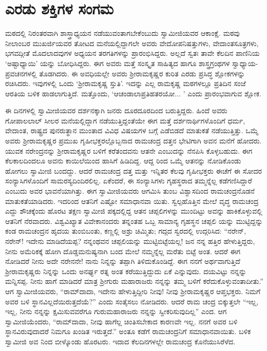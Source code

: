 
\chapter{ಎರಡು ಶಕ್ತಿಗಳ ಸಂಗಮ}

\noindent

ಮಠದಲ್ಲಿ ನಿರಂತರವಾಗಿ ಶಾಸ್ತ್ರಾಧ್ಯಯನ ನಡೆಯುವಂತಾಗಬೇಕೆಂಬುದು ಸ್ವಾಮೀಜಿಯವರ ಆಕಾಂಕ್ಷೆ. ಮಠವು ನೀಲಾಂಬರ ಮುಖರ್ಜಿಯವರ ತೋಟದ ಮನೆಯಲ್ಲಿದ್ದಾಗಲೇ ಅವರು ವೇದೋಪನಿಷತ್ತುಗಳು, ವೇದಾಂತಸೂತ್ರಗಳು, ಭಗವದ್ಗೀತೆ ಮೊದಲಾದವುಗಳ ಅಧ್ಯಯನ ತರಗತಿಗಳನ್ನು ಪ್ರಾರಂಭಿಸಿದ್ದರು. ಅಲ್ಲದೆ ಸ್ವತಃ ತಾವೇ ಕೆಲದಿನ ಪಾಣಿನಿಯ ‘ಅಷ್ಟಾಧ್ಯಾಯಿ’ ಯನ್ನು ಬೋಧಿಸಿದ್ದರು. ಈಗ ಅವರು ಮತ್ತೆ ಸಂಸ್ಕೃತ ಸಾಹಿತ್ಯದ ಹಾಗೂ ಶಾಸ್ತ್ರಗ್ರಂಥಗಳ ಸ್ವಾಧ್ಯಾಯ-ಪ್ರವಚನಗಳಲ್ಲಿ ತೊಡಗಿದರು. ಈ ಅವಧಿಯಲ್ಲೇ ಅವರು ಶ್ರೀರಾಮಕೃಷ್ಣರ ಕುರಿತ ಎರಡು ಪ್ರಸಿದ್ಧ ಶ್ಲೋಕಗಳನ್ನು ರಚಿಸಿದರು. ಇವುಗಳಲ್ಲಿ ಒಂದು ‘ಶ್ರೀರಾಮಕೃಷ್ಣ ಸ್ತುತಿ’. ಇದನ್ನು ಎಲ್ಲ ರಾಮಕೃಷ್ಣ ಮಠಗಳಲ್ಲೂ ಪ್ರತಿದಿನ ಸಂಜೆ ಆರತಿಯ ಬಳಿಕ ಹಾಡಲಾಗುತ್ತಿದೆ. ಮತ್ತೊಂದು, ‘ಆಚಂಡಾಲಾಪ್ರತಿಹತರಯೋ... ’ ಎಂದು ಪ್ರಾರಂಭವಾಗುವ ಶ್ಲೋಕ.

ಈ ದಿನಗಳಲ್ಲಿ ಸ್ವಾಮೀಜಿಯವರ ದರ್ಶನಕ್ಕಾಗಿ ಜನರು ದೂರದೂರದಿಂದ ಬರುತ್ತಿದ್ದರು. ಹಿಂದೆ ಅವರು ಗೋಪಾಲಲಾಲ್ ಸೀಲರ ಮನೆಯಲ್ಲಿದ್ದಾಗ ನಡೆಯುತ್ತಿದ್ದಂತೆಯೇ ಈಗ ಮತ್ತೆ ದರ್ಶನಾರ್ಥಿಗಳೊಂದಿಗೆ ಧರ್ಮ, ವೇದಾಂತ, ರಾಷ್ಟ್ರದ ಪುನರುತ್ಥಾನ ಮುಂತಾದ ವಿವಿಧ ವಿಷಯಗಳ ಬಗ್ಗೆ ಎಡೆಬಿಡದೆ ಮಾತುಕತೆ ನಡೆಯುತ್ತಿತ್ತು. ಒಮ್ಮೆ ಅವರು ಶ್ರೀರಾಮಕೃಷ್ಣರ ಪ್ರಮುಖ ಗೃಹೀಭಕ್ತರಲ್ಲೊಬ್ಬನಾದ ರಾಮಚಂದ್ರ ದತ್ತನ ಭೇಟಿಗಾಗಿ ಅವನ ಮನೆಗೆ ಹೋದರು. ಯುವಕ ನರೇಂದ್ರನನ್ನು ಶ್ರೀರಾಮಕೃಷ್ಣರ ಬಳಿಗೆ ಕರೆತಂದವನು ಆತನೇ ಎಂಬುದನ್ನು ನೆನಪಿಸಿ ಕೊಳ್ಳಬಹುದು. ಈಗ ಕೆಲಕಾಲದಿಂದಲೂ ಅವನು ಕಾಯಿಲೆಯಿಂದ ಹಾಸಿಗೆ ಹಿಡಿದಿದ್ದ. ಆದ್ದ ರಿಂದ ಒಮ್ಮೆ ಆತನನ್ನು ನೋಡಿಕೊಂಡು ಹೋಗಲು ಸ್ವಾಮೀಜಿ ಬಂದದ್ದು. ಆದರೆ ರಾಮಚಂದ್ರ ದತ್ತ ಮತ್ತು ಇನ್ನಿತರ ಕೆಲವು ಗೃಹೀಭಕ್ತರು ಈಚೆಗೆ ಈ ಸೋದರ ಸಂನ್ಯಾಸಿಗಳೊಂದಿಗೆ ಸಾಮರಸ್ಯದಿಂದಿರಲಿಲ್ಲ. ಏಕೆಂದರೆ, ಈ ಸಂನ್ಯಾಸಿಗಳು ಗೃಹಸ್ಥರಾದ ತಮ್ಮನ್ನೆಲ್ಲ ಕಡೆಗಣಿಸಿದ್ದಾರೆ ಎಂಬುದು ಅವರ ಭಾವನೆಯಾಗಿತ್ತು. ಈಗ ಸ್ವಾಮೀಜಿಯವರು ಆಗಮಿಸಿ ತುಂಬ ವಿಶ್ವಾಸದಿಂದ ರಾಮಚಂದ್ರನೊಡನೆ ಮಾತುಕತೆಯಾಡಿದರು. ಇದರಿಂದ ಆತನಿಗೆ ಎಷ್ಟೋ ಸಮಾಧಾನವಾ ಯಿತು. ಸ್ವಲ್ಪಹೊತ್ತಿನ ಮೇಲೆ ವೃದ್ಧ ರಾಮಚಂದ್ರ ಎದ್ದು ಶೌಚಕ್ಕೆಂದು ಹೊರಟ ತಕ್ಷಣ ಸ್ವಾಮೀಜಿ ಪಕ್ಕದಲ್ಲಿದ್ದ ಆತನ ಚಪ್ಪಲಿಗಳನ್ನು ಮುಂದಿಟ್ಟು ಅವನ್ನು ಹಾಕಿಕೊಳ್ಳುವಲ್ಲಿ ಆತನಿಗೆ ನೆರವಾದರು. ವಿಶ್ವವಿಖ್ಯಾತ ವಿವೇಕಾನಂದರು ತನ್ನಂತಹ ಒಬ್ಬ ಸಾಮಾನ್ಯ ಗೃಹಸ್ಥನ ಚಪ್ಪಲಿ ಯನ್ನು ಮುಟ್ಟಿದ್ದನ್ನು ಕಂಡ ರಾಮಚಂದ್ರನ ಹೃದಯ ತುಂಬಿಬಂತು, ಕಣ್ಣಲ್ಲಿ ಅಶ್ರು ಚಿಮ್ಮಿತು; ಗದ್ಗದ ಸ್ವರದಲ್ಲಿ ಉದ್ಗರಿಸಿದ: “ನರೇನ್, ನರೇನ್! ಇದೇನು ಮಾಡಿದೆಯಪ್ಪ? ನನ್ನಂಥವನ ಚಪ್ಪಲಿಯನ್ನು ಮುಟ್ಟಿಬಿಟ್ಟೆಯಲ್ಲ! ಜನ ನನ್ನ ಹತ್ತಿರ ಹೇಳುತ್ತಿದ್ದರು, ನೀನು ಅಮೆರಿಕಕ್ಕೆ ಹೋಗಿ ದೊಡ್ಡಮನುಷ್ಯನಾಗಿ ಬಂದ ಮೇಲೆ ನಮ್ಮನ್ನೆಲ್ಲ ಮರೆತು ಬಿಟ್ಟೆ ಅಂತ. ಆದರೆ ಈಗ ನೋಡಿದರೆ ನೀನು ಅದೇ ನರೇನನೇ! ನಾನು ನಿನ್ನನ್ನು ತಪ್ಪಾಗಿ ತಿಳಿದುಕೊಂಡಿದ್ದೆ. ಈಗ ನನಗೆ ಅರ್ಥವಾಗುತ್ತಿದೆ ಶ್ರೀರಾಮಕೃಷ್ಣರು ನಿನ್ನನ್ನು ಒಂದು ಅನರ್ಘ್ಯ ರತ್ನ ಅಂತ ಕರೆಯುತ್ತಿದ್ದುದು ಏಕೆ ಎನ್ನುವುದು. ದಯವಿಟ್ಟು ನನ್ನನ್ನು ಮನ್ನಿಸಪ್ಪ. ನೀನು ಹಾಗೆ ಮಾಡಿದರೆ ಮಾತ್ರ ಶ್ರೀಗುರು ಮಹಾರಾಜರು ನನ್ನನ್ನು ತಮ್ಮ ಬಳಿಗೆ ಕರೆದುಕೊಳ್ಳುವಂತಾದೀತು.” ಆಗ ಸ್ವಾಮೀಜಿಯವರು, “ರಾಮ್​ದಾದಾ, ಇದೇನು ಹೇಳುತ್ತಿದ್ದೀರಿ ನೀವು! ನೀವು ಶ್ರೀರಾಮಕೃಷ್ಣರ ಆಪ್ತಭಕ್ತರು. ನಿಮಗೆ ಅವರ ಬಳಿ ಸ್ಥಾನವಿಲ್ಲದೆಯಿರುತ್ತದೆಯೆ?” ಎಂದು ಸಂತೈಸಲು ನೋಡಿದರು. ಆದರೆ ರಾಮ ಚಂದ್ರ ಬಿಕ್ಕುತ್ತಲೇ “ಇಲ್ಲ, ಇಲ್ಲ, ನೀನು ನನ್ನನ್ನು ಕ್ಷಮಿಸುವವರೆಗೂ ಗುರುಮಹಾರಾಜರು ನನ್ನನ್ನು ಸ್ವೀಕರಿಸುವುದಿಲ್ಲ” ಎಂದ. ಆಗ ಸ್ವಾಮೀಜಿಯೆಂದರು, “ರಾಮ್​ದಾದಾ, ನೀವು ಹಾಗೆಲ್ಲ ಚಿಂತಿಸಬೇಕಾದ ಕಾರಣವೇ ಇಲ್ಲ. ನನಗೆ ಅವರ ಬಳಿ ಸ್ಥಾನವಿರುವುದಾದರೆ ನಿಮಗೂ ಖಂಡಿತ ಇರುತ್ತದೆ.” ಅಂತೂ ಕಡೆಗೆ ರಾಮಚಂದ್ರನಿಗೆ ಸಮಾಧಾನವಾಯಿತು. ಬಳಿಕ ಸ್ವಾಮೀಜಿ ಅವ ನಿಂದ ಬೀಳ್ಕೊಂಡು ಹೊರಟರು. ಇದಾದ ಕೆಲದಿನಗಳಲ್ಲೇ ರಾಮಚಂದ್ರ ಕೊನೆಯುಸಿರೆಳೆದ.

